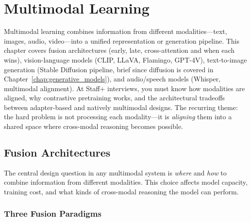 \chapter{Multimodal Learning}
\label{chap:multimodal_learning}

\begin{tldr}
Multimodal learning combines information from different modalities---text, images, audio, video---into a unified representation or generation pipeline. This chapter covers fusion architectures (early, late, cross-attention and when each wins), vision-language models (CLIP, LLaVA, Flamingo, GPT-4V), text-to-image generation (Stable Diffusion pipeline, brief since diffusion is covered in Chapter~\ref{chap:generative_models}), and audio/speech models (Whisper, multimodal alignment). At Staff+ interviews, you must know how modalities are aligned, why contrastive pretraining works, and the architectural tradeoffs between adapter-based and natively multimodal designs. The recurring theme: the hard problem is not processing each modality---it is \textit{aligning} them into a shared space where cross-modal reasoning becomes possible.
\end{tldr}

\section{Fusion Architectures}
\label{sec:fusion_architectures}

The central design question in any multimodal system is \textit{where} and \textit{how} to combine information from different modalities. This choice affects model capacity, training cost, and what kinds of cross-modal reasoning the model can perform.

\subsection{Three Fusion Paradigms}

